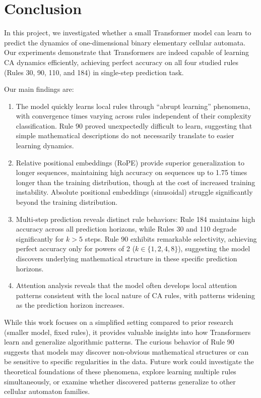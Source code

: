 \documentclass[runningheads]{llncs}
\begin{document}
\section{Conclusion}
\label{sec:conclusion}

In this project, we investigated whether a small Transformer model can learn to predict the dynamics of one-dimensional binary elementary cellular automata. Our experiments demonstrate that Transformers are indeed capable of learning CA dynamics efficiently, achieving perfect accuracy on all four studied rules (Rules 30, 90, 110, and 184) in single-step prediction task.

Our main findings are:
\begin{enumerate}
    \item The model quickly learns local rules through ``abrupt learning'' phenomena, with convergence times varying across rules independent of their complexity classification. Rule 90 proved unexpectedly difficult to learn, suggesting that simple mathematical descriptions do not necessarily translate to easier learning dynamics.
    
    \item Relative positional embeddings (RoPE) provide superior generalization to longer sequences, maintaining high accuracy on sequences up to 1.75 times longer than the training distribution, though at the cost of increased training instability. Absolute positional embeddings (sinusoidal) struggle significantly beyond the training distribution.
    
    \item Multi-step prediction reveals distinct rule behaviors: Rule 184 maintains high accuracy across all prediction horizons, while Rules 30 and 110 degrade significantly for $k > 5$ steps. Rule 90 exhibits remarkable selectivity, achieving perfect accuracy only for powers of 2 ($k \in \{1, 2, 4, 8\}$), suggesting the model discovers underlying mathematical structure in these specific prediction horizons.
    
    \item Attention analysis reveals that the model often develops local attention patterns consistent with the local nature of CA rules, with patterns widening as the prediction horizon increases.
\end{enumerate}

While this work focuses on a simplified setting compared to prior research (smaller model, fixed rules), it provides valuable insights into how Transformers learn and generalize algorithmic patterns. The curious behavior of Rule 90 suggests that models may discover non-obvious mathematical structures or can be sensitive to specific regularities in the data. Future work could investigate the theoretical foundations of these phenomena, explore learning multiple rules simultaneously, or examine whether discovered patterns generalize to other cellular automaton families.


\printbibliography
\end{document}
